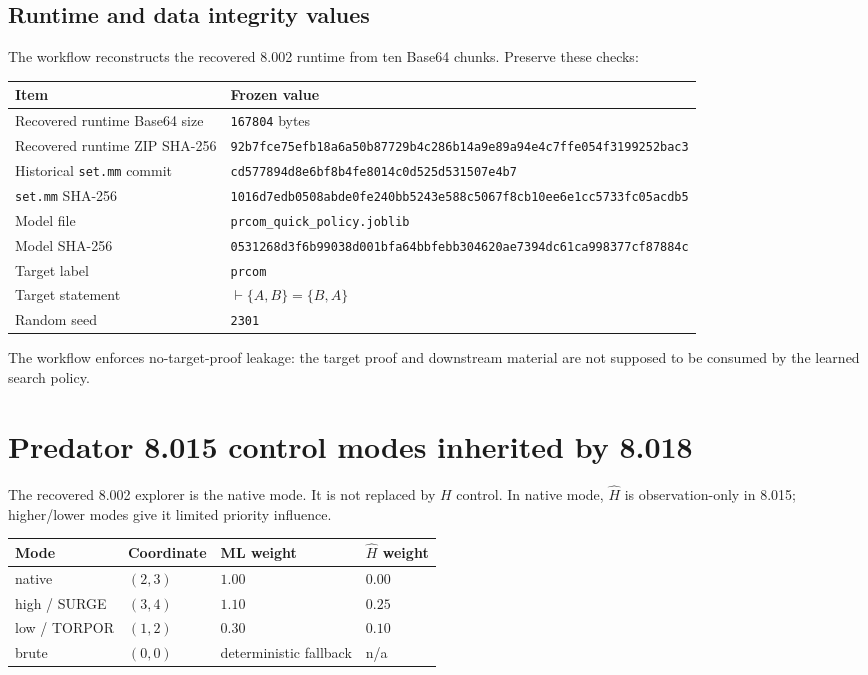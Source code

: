 \documentclass[11pt]{article}
\newcommand{\code}[1]{\texttt{#1}}
\begin{document}
\subsection{Runtime and data integrity values}

The workflow reconstructs the recovered 8.002 runtime from ten Base64 chunks. Preserve these checks:
\begin{center}
\begin{tabularx}{\textwidth}{>{\raggedright\arraybackslash}p{}X}
\toprule
Item & Frozen value \\
\midrule
Recovered runtime Base64 size & \code{167804} bytes \\
Recovered runtime ZIP SHA-256 & \code{92b7fce75efb18a6a50b87729b4c286b14a9e89a94e4c7ffe054f3199252bac3} \\
Historical \code{set.mm} commit & \code{cd577894d8e6bf8b4fe8014c0d525d531507e4b7} \\
\code{set.mm} SHA-256 & \code{1016d7edb0508abde0fe240bb5243e588c5067f8cb10ee6e1cc5733fc05acdb5} \\
Model file & \code{prcom\_quick\_policy.joblib} \\
Model SHA-256 & \code{0531268d3f6b99038d001bfa64bbfebb304620ae7394dc61ca998377cf87884c} \\
Target label & \code{prcom} \\
Target statement & $\vdash\{A,B\}=\{B,A\}$ \\
Random seed & \code{2301} \\
\bottomrule
\end{tabularx}
\end{center}

The workflow enforces no-target-proof leakage: the target proof and downstream material are not supposed to be consumed by the learned search policy.

\section{Predator 8.015 control modes inherited by 8.018}

The recovered 8.002 explorer is the native mode. It is not replaced by $H$ control. In native mode, $\widehat H$ is observation-only in 8.015; higher/lower modes give it limited priority influence.

\begin{center}
\begin{tabular}{llll}
\toprule
Mode & Coordinate & ML weight & $\widehat H$ weight \\
\midrule
native & $(2,3)$ & $1.00$ & $0.00$ \\
high / SURGE & $(3,4)$ & $1.10$ & $0.25$ \\
low / TORPOR & $(1,2)$ & $0.30$ & $0.10$ \\
brute & $(0,0)$ & deterministic fallback & n/a \\
\bottomrule
\end{tabular}
\end{center}
\end{document}

